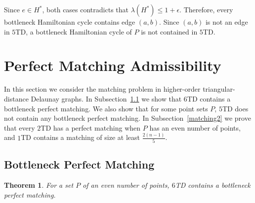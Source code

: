 \documentclass[11pt,a4paper]{article}
\newcommand{\kTD}[2]{$#1$\text{-}TD#2}
\newtheorem{theorem}{Theorem}
\begin{document}
Since $e\in H^*$, both cases contradicts that $\lambda(H^*)\le 1+\epsilon$. Therefore, every bottleneck Hamiltonian cycle contains edge $(a,b)$. Since $(a,b)$ is not an edge in \kTD{5}{}, a bottleneck Hamiltonian cycle of $P$ is not contained in \kTD{5}{}.  

\section{Perfect Matching Admissibility}
\label{matching}
In this section we consider the matching problem in higher-order triangular-distance Delaunay graphs. In Subsection~\ref{bottleneck-matching-section} we show that \kTD{6}{} contains a bottleneck perfect matching. We also show that for some point sets $P$, \kTD{5}{} does not contain any bottleneck perfect matching. In Subsection~\ref{matching2} we prove that every \kTD{2}{} has a perfect matching when $P$ has an even number of points, and \kTD{1}{} contains a matching of size at least $\frac{2(n-1)}{5}$.

\subsection{Bottleneck Perfect Matching}
\label{bottleneck-matching-section}
\begin{theorem}
\label{matching-thr}
 For a set $P$ of an even number of points, \kTD{6}{} contains a bottleneck perfect matching.
\end{theorem}
\end{document}
